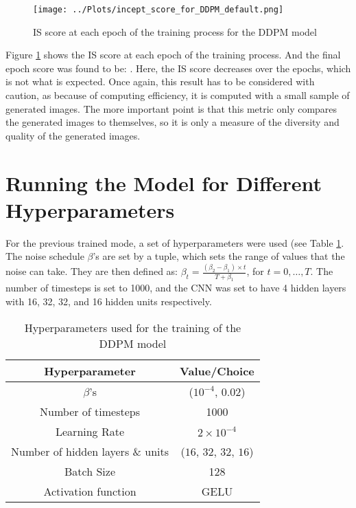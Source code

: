 \documentclass[12pt]{report} %
\begin{document}
\begin{figure}[h]
  \centering
  \texttt{[image: ../Plots/incept\_score\_for\_DDPM\_default.png]}
  \caption{IS score at each epoch of the training process for the DDPM model}
  \label{fig:is_ddpm}
\end{figure}

Figure \ref{fig:is_ddpm} shows the IS score at each epoch of the training process. And the final epoch score was found to be: . Here, the IS score decreases over the epochs, which is not what is expected. Once again, this result has to be considered with caution, as because of computing efficiency, it is computed with a small sample of generated images. The more important point is that this metric only compares the generated images to themselves, so it is only a measure of the diversity and quality of the generated images.

\section{Running the Model for Different Hyperparameters}

For the previous trained mode, a set of hyperparameters were used (see Table \ref{tab:hyperparams}. The noise schedule $\beta$'s are set by a tuple, which sets the range of values that the noise can take. They are then defined as: $\beta_{t} = \frac{(\beta_{2}-\beta_{1}) \times t}{T + \beta_{1}} $, for $t = 0, \dots, T$. The number of timesteps is set to 1000, and the CNN was set to have 4 hidden layers with 16, 32, 32, and 16 hidden units respectively.

\begin{table}[h]
  \centering
  \begin{tabular}{c c}
    \hline
    Hyperparameter & Value/Choice \\
    \hline
    $\beta$'s & ($10^{-4}$, $0.02$) \\
    Number of timesteps & 1000 \\
    Learning Rate & $2 \times 10^{-4}$ \\
    Number of hidden layers \& units & ($16$, $32$, $32$, $16$) \\
    Batch Size & 128 \\
    Activation function & GELU \\
    \hline
  \end{tabular}
  \caption{Hyperparameters used for the training of the DDPM model}
  \label{tab:hyperparams}
\end{table}
\end{document}
